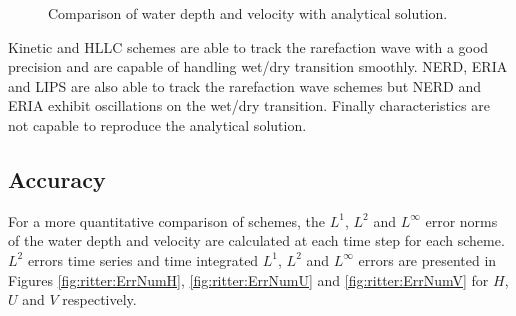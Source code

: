 \begin{figure}[H]
\begin{minipage}[t]{0.5\textwidth}
 \centering
\end{minipage}
\begin{minipage}[t]{0.5\textwidth}
 \centering
\end{minipage}
\begin{minipage}[t]{0.5\textwidth}
 \centering
\end{minipage}
\begin{minipage}[t]{0.5\textwidth}
 \centering
\end{minipage}
\begin{minipage}[t]{0.5\textwidth}
 \centering
\end{minipage}
\begin{minipage}[t]{0.5\textwidth}
 \centering
\end{minipage}
  \caption{Comparison of water depth and velocity with analytical solution.}
  \label{fig:ritter:comparison}
\end{figure}

Kinetic and HLLC schemes are able to track the rarefaction wave with a good
precision and are capable of handling wet/dry transition smoothly.
NERD, ERIA and LIPS are also able to track the rarefaction wave schemes
but NERD and ERIA exhibit oscillations on the wet/dry transition.
Finally characteristics are not capable to reproduce the analytical solution.

\subsection{Accuracy}

For a more quantitative comparison of schemes, the $L^1$, $L^2$ and $L^\infty$
error norms of the water depth and velocity are calculated at each time step
for each scheme.
$L^2$ errors time series and time integrated $L^1$, $L^2$ and $L^\infty$ errors
are presented in Figures \ref{fig:ritter:ErrNumH}, \ref{fig:ritter:ErrNumU} and
\ref{fig:ritter:ErrNumV} for $H$, $U$ and $V$ respectively.

